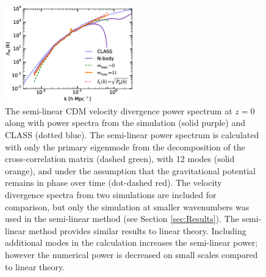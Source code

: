 \documentclass{aastex}
\begin{document}

\begin{figure}[h!]
  \centering
    \includegraphics[width=0.495\textwidth]{Figures/vel_cdm_0.eps}
    \caption{The semi-linear CDM velocity divergence
      power spectrum at $z=0$ along with 
      power spectra from the simulation (solid purple) and
      CLASS (dotted blue). The semi-linear power spectrum is calculated with only the primary
eigenmode from the decomposition of the cross-correlation matrix
(dashed green), with 12 modes (solid orange), and under the assumption
that the gravitational potential remains in phase over time
(dot-dashed red).  The velocity divergence spectra from two
    simulations are included for comparison, but only the simulation
    at smaller wavenumbers was used in the semi-linear method (see
    Section \ref{sec:Results}).  
    The semi-linear method 
    provides similar results to linear theory.  Including
    additional modes in the calculation increases the semi-linear
    power; however the
    numerical power is decreased on small scales compared to linear
    theory. 
}
    \label{fig:vel_cdm_rec}
\end{figure}
\end{document}
